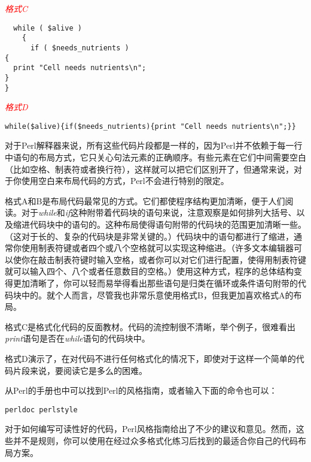 \textcolor{red}{\textit{格式C}}
\begin{adjustwidth}{1cm}{}
\begin{lstlisting}
  while ( $alive )
    {
      if ( $needs_nutrients )
{
  print "Cell needs nutrients\n";
}
}
\end{lstlisting}
\end{adjustwidth}

\textcolor{red}{\textit{格式D}}
\begin{adjustwidth}{1cm}{}
\begin{lstlisting}
while($alive){if($needs_nutrients){print "Cell needs nutrients\n";}}
\end{lstlisting}
\end{adjustwidth}

对于Perl解释器来说，所有这些代码片段都是一样的，因为Perl并不依赖于每一行中语句的布局方式，它只关心句法元素的正确顺序。有些元素在它们中间需要空白（比如空格、制表符或者换行符），这样就可以把它们区别开了，但通常来说，对于你使用空白来布局代码的方式，Perl不会进行特别的限定。

格式A和B是布局代码最常见的方式。它们都使程序结构更加清晰，便于人们阅读。对于\textit{while}和\textit{if}这种附带着代码块的语句来说，注意观察是如何排列大括号、以及缩进代码块中的语句的。这种布局使得语句附带的代码块的范围更加清晰一些。（这对于长的、复杂的代码块是非常关键的。）代码块中的语句都进行了缩进，通常你使用制表符键或者四个或八个空格就可以实现这种缩进。（许多文本编辑器可以使你在敲击制表符键时输入空格，或者你可以对它们进行配置，使得用制表符键就可以输入四个、八个或者任意数目的空格。）使用这种方式，程序的总体结构变得更加清晰了，你可以轻而易举得看出那些语句是归类在循环或条件语句附带的代码块中的。就个人而言，尽管我也非常乐意使用格式B，但我更加喜欢格式A的布局。

格式C是格式化代码的反面教材。代码的流控制很不清晰，举个例子，很难看出\textit{print}语句是否在\textit{while}语句的代码块中。

格式D演示了，在对代码不进行任何格式化的情况下，即使对于这样一个简单的代码片段来说，要阅读它是多么的困难。

从Perl的手册也中可以找到Perl的风格指南，或者输入下面的命令也可以：

\begin{lstlisting}
perldoc perlstyle
\end{lstlisting}

对于如何编写可读性好的代码，Perl风格指南给出了不少的建议和意见。然而，这些并不是规则，你可以使用在经过众多格式化练习后找到的最适合你自己的代码布局方案。

